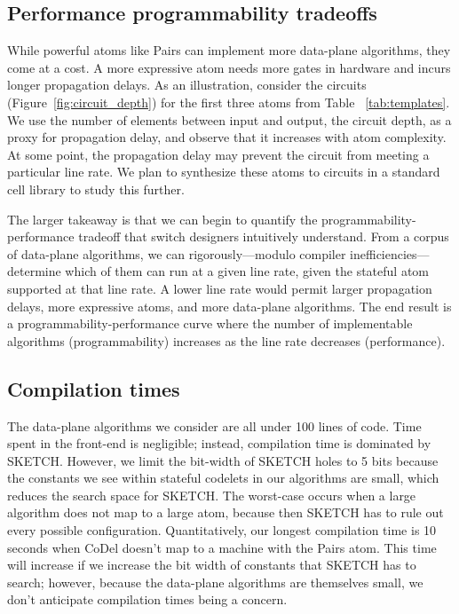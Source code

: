 \subsection{Performance programmability tradeoffs}
While powerful atoms like Pairs can implement more data-plane algorithms, they
come at a cost.  A more expressive atom needs more gates in hardware and incurs
longer propagation delays.  As an illustration, consider the circuits
(Figure~\ref{fig:circuit_depth}) for the first three atoms from Table
~\ref{tab:templates}. We use the number of elements between input and output,
the circuit depth, as a proxy for propagation delay, and observe that it
increases with atom complexity. At some point, the propagation delay may
prevent the circuit from meeting a particular line rate.  We plan to synthesize
these atoms to circuits in a standard cell library to study this further.

The larger takeaway is that we can begin to quantify the
programmability-performance tradeoff that switch designers intuitively
understand. From a corpus of data-plane algorithms, we can rigorously---modulo
compiler inefficiencies---determine which of them can run at a given line rate,
given the stateful atom supported at that line rate. A lower line rate would
permit larger propagation delays, more expressive atoms, and more data-plane
algorithms. The end result is a programmability-performance curve where the
number of implementable algorithms (programmability) increases as the line rate
decreases (performance).

\subsection{Compilation times}
The data-plane algorithms we consider are all under 100 lines of code.  Time
spent in the front-end is negligible; instead, compilation time is dominated by
SKETCH. However, we limit the bit-width of SKETCH holes to 5 bits because the
constants we see within stateful codelets in our algorithms are small, which
reduces the search space for SKETCH.  The worst-case occurs when a large
algorithm does not map to a large atom, because then SKETCH has to rule out
every possible configuration.  Quantitatively, our longest compilation time is
10 seconds when CoDel doesn't map to a \absmachine machine with the Pairs atom.
This time will increase if we increase the bit width of constants that SKETCH
has to search; however, because the data-plane algorithms are themselves small,
we don't anticipate compilation times being a concern.
